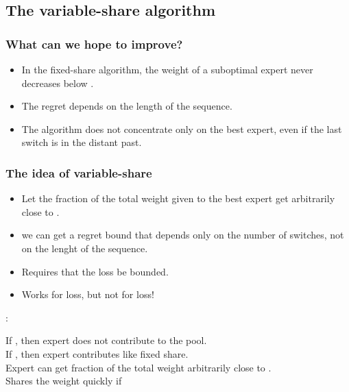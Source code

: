 \documentclass{beamer}
\begin{document}
\begin{small}
\section{The variable-share algorithm}

\begin{frame}
\frametitle{What can we hope to improve?}
\begin{itemize}
\item In the fixed-share algorithm, the 
weight of a suboptimal expert never decreases below
.
\item The regret depends on the length of the sequence.
\item The algorithm does not concentrate only on the best expert, even
if the last switch is in the distant past.
\end{itemize}
\end{frame}

\begin{frame}
\frametitle{The idea of variable-share}
\begin{itemize}
\item Let the fraction of the total weight given to the 
best expert get arbitrarily close to .
\item we can get a regret bound that depends only on the number of
switches, not on the lenght of the sequence.
\item Requires that the loss be bounded.
\item Works for  loss, but not for  loss!
\end{itemize}
\end{frame}

\begin{frame}
: 

\pause
If , then expert  does not contribute to the pool.\\
\pause
If , then expert  contributes like fixed share.\\
\pause
Expert can get fraction of the total weight arbitrarily close to .\\
\pause
Shares the weight quickly if 
\end{frame}


\end{small}
\end{document}
